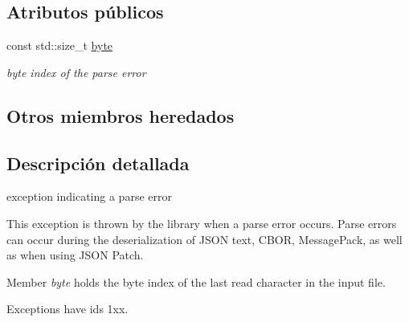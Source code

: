 \subsection*{Atributos públicos}
\begin{DoxyCompactItemize}
\item 
const std\+::size\+\_\+t \mbox{\hyperlink{classnlohmann_1_1detail_1_1parse__error_a9505aaa1ca943be927eec7cc579592ff}{byte}}
\begin{DoxyCompactList}\small\item\em byte index of the parse error \end{DoxyCompactList}\end{DoxyCompactItemize}
\subsection*{Otros miembros heredados}


\subsection{Descripción detallada}
exception indicating a parse error 

This exception is thrown by the library when a parse error occurs. Parse errors can occur during the deserialization of J\+S\+ON text, C\+B\+OR, Message\+Pack, as well as when using J\+S\+ON Patch.

Member {\itshape byte} holds the byte index of the last read character in the input file.

Exceptions have ids 1xx.

